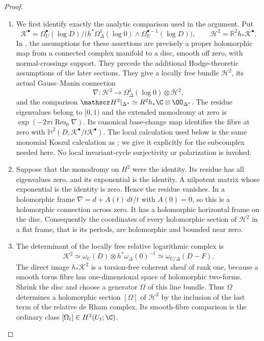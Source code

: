 \begin{proof}

\begin{enumerate}[label={$\langle1\rangle$\arabic*.},leftmargin=*]
\item We first identify exactly the analytic comparison used in the
argument. Put
\[
\mathscr K^\bullet=
 \Omega_U^\bullet(\log D)\big/
 \bigl(h^*\Omega_\Delta^1(\log0)\wedge
       \Omega_U^{\bullet-1}(\log D)\bigr),\qquad
\mathscr H^2=\mathbb R^2h_*\mathscr K^\bullet.
\]
In \cite[\S2.1, p.~234; Theorem~2.18, pp.~237--238; \S2.19 and Proposition~2.20, pp.~238--239; Theorem~2.21, p.~239]{Steenbrink1976}, the assumptions for these assertions
are precisely a proper holomorphic map from a connected complex
manifold to a disc, smooth off zero, with normal-crossings support.
They precede the additional Hodge-theoretic assumptions of the
later sections. They give a locally free bundle $\mathscr H^2$,
its actual Gauss--Manin connection
\[
\nabla:\mathscr H^2\longrightarrow
\Omega_\Delta^1(\log0)\otimes\mathscr H^2,
\]
and the comparison
$\mathscr H^2|_{\Delta^*}\simeq
R^2h_*\C\otimes\OO_{\Delta^*}$.
The residue eigenvalues belong to $[0,1)$ and the extended
monodromy at zero is
$\exp(-2\pi i\operatorname{Res}_0\nabla)$.
Its canonical base-change map identifies the fibre at zero with
$\mathbb H^2(D,\mathscr K^\bullet/t\mathscr K^\bullet)$.
The local calculation used below is the same monomial Koszul
calculation as \cite[Proposition~1.13, pp.~233--234, and proof of Proposition~2.20, pp.~238--239]{Steenbrink1976}; we give it explicitly for the
subcomplex needed here. No local invariant-cycle surjectivity
or polarization is invoked.

\item Suppose that the monodromy on $H^2$ were the identity. Its
residue has all eigenvalues zero, and its exponential is the
identity. A nilpotent matrix whose exponential is the identity
is zero. Hence the residue vanishes. In a holomorphic frame
$\nabla=d+A(t)\,dt/t$ with $A(0)=0$, so this is a holomorphic
connection across zero. It has a holomorphic horizontal frame
on the disc. Consequently the coordinates of every holomorphic
section of $\mathscr H^2$ in a flat frame, that is its periods,
are holomorphic and bounded near zero.

\item The determinant of the locally free relative logarithmic complex is
\[
\mathscr K^2\simeq
 \omega_U(D)\otimes h^*\omega_\Delta(0)^{-1}
 \simeq\omega_{U/\Delta}(D-F).
\]
The direct image $h_*\mathscr K^2$ is a torsion-free
coherent sheaf of rank one, because a smooth torus fibre has
one-dimensional space of holomorphic two-forms. Shrink the disc
and choose a generator $\Omega$ of this line bundle.
Thus $\Omega$ determines a holomorphic section $[\Omega]$ of
$\mathscr H^2$ by the inclusion of the last term of the
relative de Rham complex. Its smooth-fibre comparison is the
ordinary class $[\Omega_t]\in H^2(U_t;\C)$.


\end{enumerate}
\end{proof}
